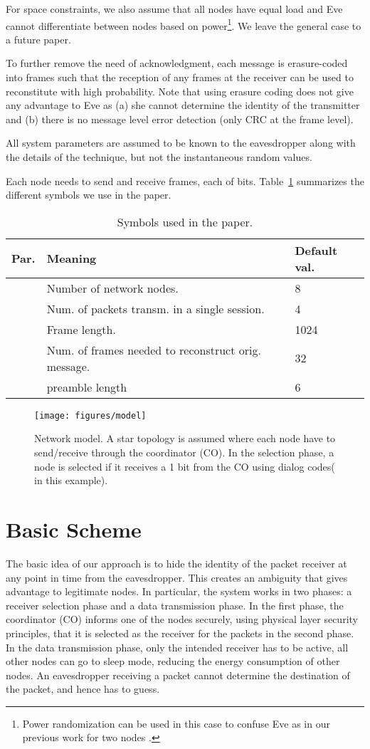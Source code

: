 \documentclass[10pt,letterpaper,conference]{IEEEtran}
\begin{document}
For space constraints, we also assume that all nodes have equal load and Eve
cannot differentiate between nodes based on power\footnote{Power randomization
can be used in this case to confuse Eve as in our previous work
for two nodes \cite{Elmorsy}.}. We leave the general case to a future paper.

To further remove the need of acknowledgment, each message  is erasure-coded
into  frames such that the reception of any  frames at the receiver
can be used to reconstitute  with high probability. Note that using erasure
coding does not give any advantage to Eve as (a) she cannot determine the
identity of the transmitter and (b) there is no message level error detection
(only CRC at the frame level).

All system parameters are assumed to be known to the eavesdropper along with the
details of the technique, but not the instantaneous random values.

Each node needs to send and receive  frames, each of  bits. 
Table~\ref{Symbol_table} summarizes the
different symbols we use in the paper.

\begin{table}[!t]
\begin{tabular}{|c|l|l|}
\hline
Par. & Meaning & Default val. \\
\hline
\hline
  & Number of network nodes. & 8\tabularnewline
\hline
  & Num. of packets transm. in a single session. & 4\tabularnewline
\hline
  & Frame length. & 1024\tabularnewline
\hline
  & Num. of frames needed to reconstruct orig.
message. & 32\tabularnewline
\hline
  & preamble length & 6\tabularnewline
\hline
\end{tabular}
\caption{Symbols used in the paper.}
\label{Symbol_table}
\end{table}

\begin{figure}
\centering
\texttt{[image: figures/model]}
\caption{Network model. A star topology is assumed where each node have to
send/receive through the coordinator (CO). In the selection phase, a node is selected if it receives a 1 bit from the CO using dialog codes( in this
example).}
\label{fig:Network}
\end{figure}

\section{Basic Scheme}
\label{sec:basic}

The basic idea of our approach is to hide the identity of the packet receiver at
any point in time from the eavesdropper. This creates an ambiguity that gives
advantage to legitimate nodes. In particular, the system works in two phases: a
receiver selection phase and a data transmission phase. In the first phase, the
coordinator (CO) informs one of the  nodes securely, using physical layer security
principles, that it is selected as the receiver for the packets in the second
phase. In the data transmission phase, only the intended receiver has to be
active, all other nodes can go to sleep mode, reducing the energy consumption of
other nodes. An eavesdropper receiving a packet cannot determine the destination
of the packet, and hence has to guess.
\end{document}
